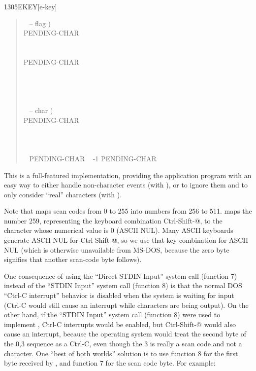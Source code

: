 \begin{worddef}{1305}{EKEY}[e-key]
\begin{defer}
\begin{quote}
\begin{tabbing}
			\+ \word{:} ~  -- flag ) \\
				\+ PENDING-CHAR    \\
					\+ ~   \\
						\+    \\
						\-	PENDING-CHAR \word{!}~   \\
					\-   \\
				\- ~   \\
			\- ~  \\
			\word{;} \\[\parskip]

			\+ \word{:} ~  -- char ) \\
				\+ PENDING-CHAR    \\
					~ ~    \\
					\>  \\
				\-	~  \\
			\- ~ PENDING-CHAR ~ -1 PENDING-CHAR \word{!} \\
			\word{;}
			\end{tabbing}
		\end{quote}

		This is a full-featured implementation, providing the
		application program with an easy way to either handle
		non-character events (with ), or to ignore them
		and to only consider ``real'' characters (with
		).

		Note that  maps scan codes from 0 to 255 into
		numbers from 256 to 511.  maps the number 259,
		representing the keyboard combination Ctrl-Shift-@, to the
		character whose numerical value is 0 (ASCII NUL). Many ASCII
		keyboards generate ASCII NUL for Ctrl-Shift-@, so we use that
		key combination for ASCII NUL (which is otherwise unavailable
		from MS-DOS, because the zero byte signifies that another
		scan-code byte follows).

		One consequence of using the ``Direct STDIN Input'' system call
		(function 7) instead of the ``STDIN Input'' system call
		(function 8) is that the normal DOS ``Ctrl-C interrupt'' behavior
		is disabled when the system is waiting for input (Ctrl-C would
		still cause an interrupt while characters are being output). On
		the other hand, if the ``STDIN Input'' system call (function 8)
		were used to implement , Ctrl-C interrupts would be
		enabled, but Ctrl-Shift-@ would also cause an interrupt, because
		the operating system would treat the second byte of the 0,3
		sequence as a Ctrl-C, even though the 3 is really a scan code
		and not a character. One ``best of both worlds'' solution is to
		use function 8 for the first byte received by , and
		function 7 for the scan code byte. For example:


\end{defer}
\end{worddef}
